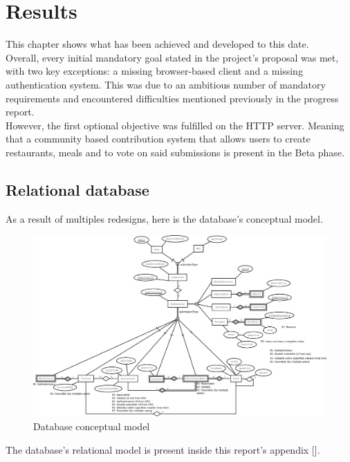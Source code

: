 %
%
\chapter{Results}
This chapter shows what has been achieved and developed to this date.\\

Overall, every initial mandatory goal stated in the project's proposal was met, with two key exceptions: 
a missing browser-based client and a missing authentication system. 
This was due to an ambitious number of mandatory requirements and encountered difficulties mentioned previously in the progress report.\\

However, the first optional objective was fulfilled on the HTTP server. Meaning that a community based contribution system that
allows users to create restaurants, meals and to vote on said submissions is present in the Beta phase.\\
\newpage
\section{Relational database}

As a result of multiples redesigns, here is the database's conceptual model.

\begin{figure}[H]    
    \includegraphics[scale=0.2]{_figures/Nutr.io_Database_Diagram.eps}
    \caption{Database conceptual model}
\end{figure}

The database's relational model is present inside this report's appendix [].\\

